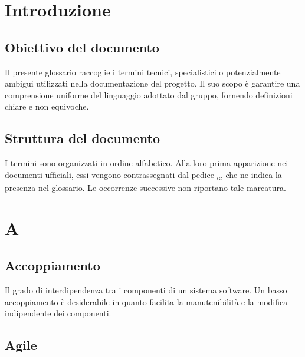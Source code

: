 \documentclass[a4paper, 11pt, oneside]{scrartcl} %
\begin{document}


\section{Introduzione}

\subsection{Obiettivo del documento}
Il presente glossario raccoglie i termini tecnici, specialistici o potenzialmente ambigui utilizzati nella documentazione del progetto.
Il suo scopo è garantire una comprensione uniforme del linguaggio adottato dal gruppo, fornendo definizioni chiare e non equivoche.
\subsection{Struttura del documento}
I termini sono organizzati in ordine alfabetico.
Alla loro prima apparizione nei documenti ufficiali, essi vengono contrassegnati dal pedice \textsubscript{\textsc{g}}, che ne indica la presenza nel glossario.
Le occorrenze successive non riportano tale marcatura.

\newpage
\appendix


\section*{A}


\subsection*{Accoppiamento}


Il grado di interdipendenza tra i componenti di un sistema software. Un basso accoppiamento è desiderabile in quanto facilita la manutenibilità e la modifica indipendente dei componenti.

\vspace{0.5cm}

\subsection*{Agile}
\end{document}

